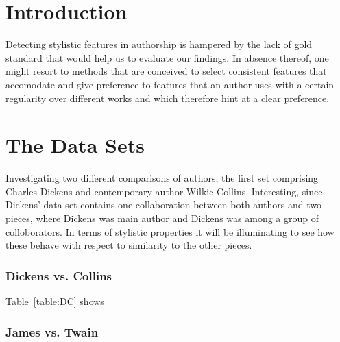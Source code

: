 \documentclass[a4paper,10pt,twoside,fleqn]{article}
\begin{document}
\section{Introduction}

Detecting stylistic features in authorship is hampered by the lack of gold
standard that would help us to evaluate our findings. 
In absence thereof, one might resort to methods that are conceived to select 
consistent features that accomodate and give preference to features that 
an author uses with a certain regularity over different works and which 
therefore hint at a clear preference. 




\section{The Data Sets}

Investigating two different comparisons of authors, the first set comprising Charles Dickens and 
contemporary author Wilkie Collins. 
Interesting, since Dickens' data set contains one collaboration between both authors and 
two pieces, where Dickens was main author and Dickens was among a group of colloborators. 
In terms of stylistic properties it will be illuminating to see how these behave 
with respect to similarity to the other pieces. 

\subsubsection{Dickens vs. Collins}
Table~\ref{table:DC} shows 




\subsubsection{James vs. Twain}
\end{document}
